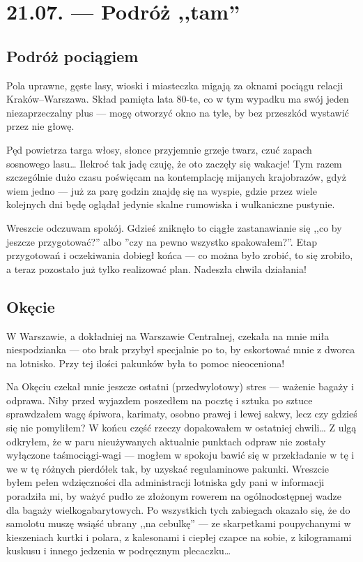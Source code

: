 \chapter*{21.07. --- Podróż ,,tam''}

\section*{Podróż pociągiem}

Pola uprawne, gęste lasy, wioski i miasteczka migają za oknami pociągu relacji Kraków--Warszawa. Skład pamięta lata 80-te, co w tym wypadku ma swój jeden niezaprzeczalny plus --- mogę otworzyć okno na tyle, by bez przeszkód wystawić przez nie głowę.

Pęd powietrza targa włosy, słonce przyjemnie grzeje twarz, czuć zapach sosnowego lasu… Ilekroć tak jadę czuję, że oto zaczęły się wakacje! Tym razem szczególnie dużo czasu poświęcam na kontemplację mijanych krajobrazów, gdyż wiem jedno --- już za parę godzin znajdę się na wyspie, gdzie przez wiele kolejnych dni będę oglądał jedynie skalne rumowiska i wulkaniczne pustynie.

Wreszcie odczuwam spokój. Gdzieś zniknęło to ciągłe zastanawianie się ,,co by jeszcze przygotować?'' albo ''czy na pewno wszystko spakowałem?''. Etap przygotowań i oczekiwania dobiegł końca --- co można było zrobić, to się zrobiło, a teraz pozostało już tylko realizować plan. Nadeszła chwila działania!

\section*{Okęcie}

W Warszawie, a dokładniej na Warszawie Centralnej, czekała na mnie miła niespodzianka --- oto brak przybył specjalnie po to, by eskortować mnie z dworca na lotnisko. Przy tej ilości pakunków była to pomoc nieoceniona!

Na Okęciu czekał mnie jeszcze ostatni (przedwylotowy) stres --- ważenie bagaży i odprawa. Niby przed wyjazdem poszedłem na pocztę i sztuka po sztuce sprawdzałem wagę śpiwora, karimaty, osobno prawej i lewej sakwy, lecz czy gdzieś się nie pomyliłem? W końcu część rzeczy dopakowałem w ostatniej chwili… Z ulgą odkryłem, że w paru nieużywanych aktualnie punktach odpraw nie zostały wyłączone taśmociągi-wagi --- mogłem w spokoju bawić się w przekładanie w tę i we w tę różnych pierdółek tak, by uzyskać regulaminowe pakunki. Wreszcie byłem pełen wdzięczności dla administracji lotniska gdy pani w informacji poradziła mi, by ważyć pudło ze złożonym rowerem na ogólnodostępnej wadze dla bagaży wielkogabarytowych. Po wszystkich tych zabiegach okazało się, że do samolotu muszę wsiąść ubrany ,,na cebulkę'' --- ze skarpetkami poupychanymi w kieszeniach kurtki i polara, z kalesonami i ciepłej czapce na sobie, z kilogramami kuskusu i innego jedzenia w podręcznym plecaczku…

